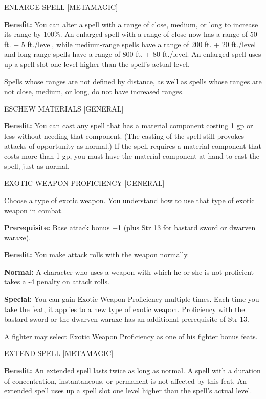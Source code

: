 \documentclass{article}
\begin{document}
\vspace{12pt}
ENLARGE SPELL [METAMAGIC]

\textbf{Benefit:} You can alter a spell with a range of close, medium, or long 
to increase its range by 100\%. An enlarged spell with a range of close now has 
a range of 50 ft. + 5 ft./level, while medium-range spells have a range of 200 
ft. + 20 ft./level and long-range spells have a range of 800 ft. + 80 ft./level. 
An enlarged spell uses up a spell slot one level higher than the spell's actual 
level.

Spells whose ranges are not defined by distance, as well as spells whose ranges 
are not close, medium, or long, do not have increased ranges.

\vspace{12pt}
ESCHEW MATERIALS [GENERAL]

\textbf{Benefit:} You can cast any spell that has a material component costing 
1 gp or less without needing that component. (The casting of the spell still provokes 
attacks of opportunity as normal.) If the spell requires a material component that 
costs more than 1 gp, you must have the material component at hand to cast the 
spell, just as normal.

\vspace{12pt}
EXOTIC WEAPON PROFICIENCY [GENERAL]

Choose a type of exotic weapon. You understand how to use that type of exotic weapon 
in combat.

\textbf{Prerequisite:} Base attack bonus +1 (plus Str 13 for bastard sword or dwarven 
waraxe).

\textbf{Benefit:} You make attack rolls with the weapon normally.

\textbf{Normal:} A character who uses a weapon with which he or she is not proficient 
takes a -4 penalty on attack rolls.

\textbf{Special:} You can gain Exotic Weapon Proficiency multiple times. Each time 
you take the feat, it applies to a new type of exotic weapon. Proficiency with 
the bastard sword or the dwarven waraxe has an additional prerequisite of Str 13.

A fighter may select Exotic Weapon Proficiency as one of his fighter bonus feats.

\vspace{12pt}
EXTEND SPELL [METAMAGIC]

\textbf{Benefit:} An extended spell lasts twice as long as normal. A spell with 
a duration of concentration, instantaneous, or permanent is not affected by this 
feat. An extended spell uses up a spell slot one level higher than the spell's 
actual level.
\end{document}
